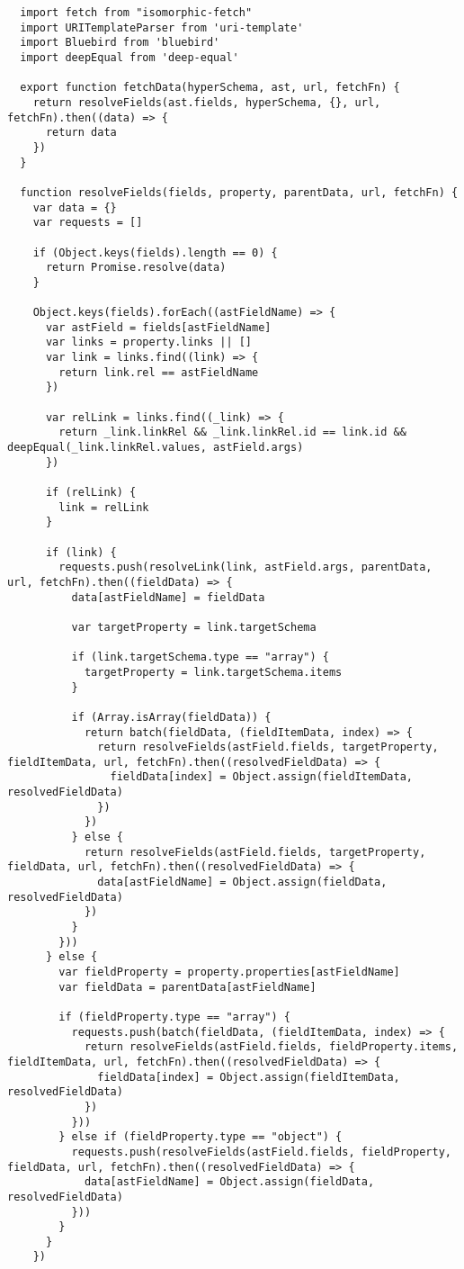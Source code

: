 \begin{verbatim}
  import fetch from "isomorphic-fetch"
  import URITemplateParser from 'uri-template'
  import Bluebird from 'bluebird'
  import deepEqual from 'deep-equal'

  export function fetchData(hyperSchema, ast, url, fetchFn) {
    return resolveFields(ast.fields, hyperSchema, {}, url, fetchFn).then((data) => {
      return data
    })
  }

  function resolveFields(fields, property, parentData, url, fetchFn) {
    var data = {}
    var requests = []

    if (Object.keys(fields).length == 0) {
      return Promise.resolve(data)
    }

    Object.keys(fields).forEach((astFieldName) => {
      var astField = fields[astFieldName]
      var links = property.links || []
      var link = links.find((link) => {
        return link.rel == astFieldName
      })

      var relLink = links.find((_link) => {
        return _link.linkRel && _link.linkRel.id == link.id && deepEqual(_link.linkRel.values, astField.args)
      })

      if (relLink) {
        link = relLink
      }

      if (link) {
        requests.push(resolveLink(link, astField.args, parentData, url, fetchFn).then((fieldData) => {
          data[astFieldName] = fieldData

          var targetProperty = link.targetSchema

          if (link.targetSchema.type == "array") {
            targetProperty = link.targetSchema.items
          }

          if (Array.isArray(fieldData)) {
            return batch(fieldData, (fieldItemData, index) => {
              return resolveFields(astField.fields, targetProperty, fieldItemData, url, fetchFn).then((resolvedFieldData) => {
                fieldData[index] = Object.assign(fieldItemData, resolvedFieldData)
              })
            })
          } else {
            return resolveFields(astField.fields, targetProperty, fieldData, url, fetchFn).then((resolvedFieldData) => {
              data[astFieldName] = Object.assign(fieldData, resolvedFieldData)
            })
          }
        }))
      } else {
        var fieldProperty = property.properties[astFieldName]
        var fieldData = parentData[astFieldName]

        if (fieldProperty.type == "array") {
          requests.push(batch(fieldData, (fieldItemData, index) => {
            return resolveFields(astField.fields, fieldProperty.items, fieldItemData, url, fetchFn).then((resolvedFieldData) => {
              fieldData[index] = Object.assign(fieldItemData, resolvedFieldData)
            })
          }))
        } else if (fieldProperty.type == "object") {
          requests.push(resolveFields(astField.fields, fieldProperty, fieldData, url, fetchFn).then((resolvedFieldData) => {
            data[astFieldName] = Object.assign(fieldData, resolvedFieldData)
          }))
        }
      }
    })


\end{verbatim}
